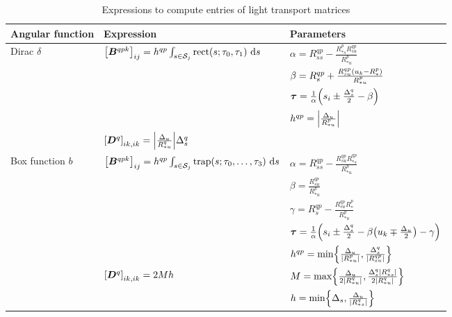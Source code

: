 \begin{table}
    \centering
    \begin{tabular}{lll}
        \toprule
        {\bf Angular function} & {\bf Expression} & {\bf Parameters} \\
        \midrule 
        Dirac $\delta$ 
        &
        $ {\left[ {\bm{B}}^{qpk} \right] }_{ij} = h^{qp} \int_{s \in \mathcal{S}_j} \text{rect} {\left( s; \tau_0, \tau_1 \right)} ~\text{d}{s}$
        &
        $\alpha = R^{qp}_{ss} - \frac{R^p_{*s} R^{qp}_{su}}{R^p_{*u}}$
        \\ & & 
        $\beta = R^{qp}_s + \frac{R^{qp}_{su} {\left( u_k - R^p_* \right)}}{R^p_{*u}}$
        \\ & &
        ${\bm{\tau}} = \frac{1}{\alpha} {\left( s_i \pm \frac{\Delta_s^q}{2} - \beta \right)}$
        \\ & &
        $h^{qp} =  {\left| \frac{\Delta_u}{R^p_{*u}} \right| }$
        \\
        &
        $\GB{\bD^q}_{ik, ik} = \GM{%
            \frac{\Delta_u}{R^q_{*u}}
        }
        \Delta_s^q$
        \\
        \midrule
        Box function $b$
        &
        $ {\left[ {\bm{B}}^{qpk} \right] }_{ij} = h^{qp} \int_{s \in \mathcal{S}_j} \text{trap} {\left( s; \tau_0, \ldots, \tau_3 \right)} ~\text{d}{s}$
        &
        $\alpha = R^{qp}_{ss} - \frac{R^{qp}_{su} R^{qp}_{*s}}{R^p_{*u}}$ 
        \\ & &
        $\beta = \frac{R^{qp}_{su}}{R^p_{*u}}$
        \\ & &
        $\gamma = R^{qp}_s - \frac{R^{qp}_{su} R^p_*}{R^p_{*u}}$
        \\ & &
        ${\bm{\tau}} = \frac{1}{\alpha} {\left( s_i \pm \frac{\Delta_s^q}{2} - \beta {\left( u_k \mp \frac{\Delta_u}{2} \right)} - \gamma \right)}$
        \\ & &
        $h^{qp} = \text{min}\GC{%
            \frac{\Delta_u}{\GM{R^p_{*u}}},
            \frac{\Delta^q_s}{\GM{R^{qp}_{su}}}
        }$
        \\
        &
        $ {\left[ {\bm{D}}^q \right] }_{ik, ik} = 2 M h$
        &
        $M = \text{max}\GC{%
            \frac{\Delta_u}{2 \GM{R^q_{*u}}},
            \frac{\Delta_s^q \GM{R^q_{*s}}}{2 \GM{R^q_{*u}}}
        }$
        \\ & &
        $h = \text{min}\GC{%
            \Delta_s, 
            \frac{\Delta_u}{\GM{R^q_{*s}}}
        }$
        \\ \bottomrule 
    \end{tabular}
    \caption{Expressions to compute entries of light transport matrices}
    \label{tab,xport}
\end{table}
